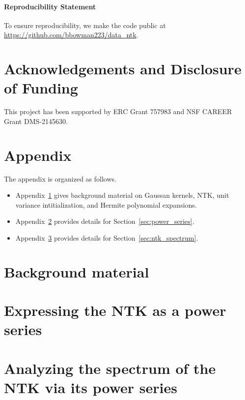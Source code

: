\documentclass{article} %
\begin{document}
\paragraph{Reproducibility Statement} 
To ensure reproducibility, we make the code public at \url{https://github.com/bbowman223/data_ntk}. 

\section*{Acknowledgements and Disclosure of Funding}
This project has been supported by ERC Grant 757983 and NSF CAREER Grant DMS-2145630. 

\newpage 




\newpage 

\appendix

\section*{Appendix} 

The appendix is organized as follows. 
\begin{itemize}[leftmargin=*]
    \item Appendix~\ref{app:background} %
    gives background material on Gaussan kernels, NTK, unit variance intitialization, and Hermite polynomial expansions. 
    
    \item Appendix~\ref{appendix:power_series} %
    provides details for Section~\ref{sec:power_series}. 
    
    \item Appendix~\ref{appendix:ntk_spectrum} %
    provides details for Section~\ref{sec:ntk_spectrum}. 
\end{itemize}

\section{Background material}
\label{app:background}


\section{Expressing the NTK as a power series}\label{appendix:power_series}


\section{Analyzing the spectrum of the NTK via its power series}\label{appendix:ntk_spectrum}

\end{document}
